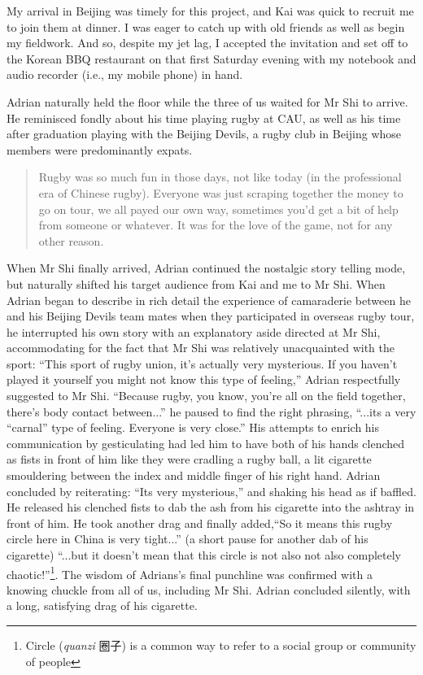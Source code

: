 My arrival in Beijing was timely for this project, and Kai was quick to recruit me to join them at dinner.  I was eager to catch up with old friends as well as begin my fieldwork. And so, despite my jet lag, I accepted the invitation and set off to the Korean BBQ restaurant on that first Saturday evening with my notebook and audio recorder (i.e., my mobile phone) in hand.

Adrian naturally held the floor while the three of us waited for Mr Shi to arrive.  He reminisced fondly about his time playing rugby at CAU, as well as his time after graduation playing with the Beijing Devils, a rugby club in Beijing whose members were predominantly expats.

\begin{quotation}
      Rugby was so much fun in those days, not like today (in the professional era of Chinese rugby).  Everyone was just scraping together the money to go on tour, we all payed our own way, sometimes you'd get a bit of help from someone or whatever. It was for the love of the game, not for any other reason.
\end{quotation}

When Mr Shi finally arrived, Adrian continued the nostalgic story telling mode, but naturally shifted his target audience from Kai and me to Mr Shi.  When Adrian began to describe in rich detail the experience of camaraderie between he and his Beijing Devils team mates when they participated in overseas rugby tour, he interrupted his own story with an explanatory aside directed at Mr Shi, accommodating for the fact that Mr Shi was relatively unacquainted with the sport: ``This sport of rugby union, it's actually very mysterious. If you haven't played it yourself you might not know this type of feeling,'' Adrian respectfully suggested to Mr Shi.  ``Because rugby, you know, you're all on the field together, there's body contact between...'' he paused to find the right phrasing,  ``...its a very ``carnal'' type of feeling. Everyone is very close.''  His attempts to enrich his communication by gesticulating had led him to have both of his hands clenched as fists in front of him like they were cradling a rugby ball, a lit cigarette smouldering between the index and middle finger of his right hand.  Adrian concluded by reiterating: ``Its very mysterious,'' and shaking his head as if baffled.  He released his clenched fists to dab the ash from his cigarette into the ashtray in front of him. He took another drag and finally added,``So it means this rugby circle here in China is very tight...'' (a short pause for another dab of his cigarette) ``...but it doesn't mean that this circle is not also not also completely chaotic!''\footnote{Circle (\textit{quanzi} 圈子) is a common way to refer to a social group or community of people}.  The wisdom of Adrians's final punchline was confirmed with a knowing chuckle from all of us, including Mr Shi. Adrian concluded silently, with a long, satisfying drag of his cigarette.

